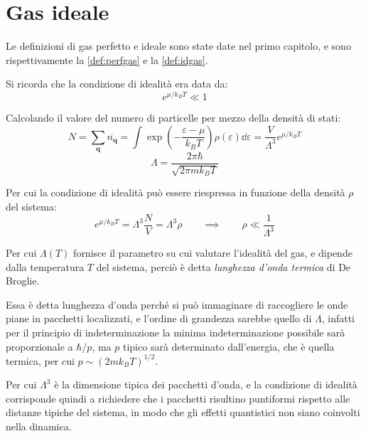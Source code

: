 
\section{Gas ideale}
\label{sec:idgas}

Le definizioni di gas perfetto e ideale sono state date nel primo capitolo, e sono rispettivamente la \cref{def:perfgas} e la \cref{def:idgas}.

Si ricorda che la condizione di idealità era data da:
\begin{equation*}
e^{\mu/k_B T} \ll 1
\end{equation*}

Calcolando il valore del numero di particelle per mezzo della densità di stati:
\begin{equation*}
N = \sum_{\textbf{q}} \overline{n_{\textbf{q}}} = \int \exp \left(- \frac{\varepsilon - \mu}{k_B T}\right) \rho(\varepsilon) \dd \varepsilon = \frac{V}{\Lambda^3} e^{\mu/k_B T}
\end{equation*}
\begin{equation*}
\Lambda = \frac{2\pi \hbar}{\sqrt{2\pi m k_B T}}
\end{equation*}

Per cui la condizione di idealità può essere riespressa in funzione della densità $\rho$ del sistema:
\begin{equation*}
	e^{\mu/k_B T} = \Lambda^3 \frac{N}{V} = \Lambda^3 \rho	\qquad \implies \qquad \rho \ll \frac{1}{\Lambda^3}
\end{equation*}

Per cui $\Lambda(T)$ fornisce il parametro su cui valutare l'idealità del gas, e dipende dalla temperatura $T$ del sistema, perciò è detta \textit{lunghezza d'onda termica} di De Broglie.

Essa è detta lunghezza d'onda perché si può immaginare di raccogliere le onde piane in pacchetti localizzati, e l'ordine di grandezza sarebbe quello di $\Lambda$, infatti per il principio di indeterminazione la minima indeterminazione possibile sarà proporzionale a $\hbar/p$, ma $p$ tipico sarà determinato dall'energia, che è quella termica, per cui $p \sim (2 m k_B T)^{1/2}$.

Per cui $\Lambda^3$ è la dimensione tipica dei pacchetti d'onda, e la condizione di idealità corrisponde quindi a richiedere che i pacchetti risultino puntiformi rispetto alle distanze tipiche del sistema, in modo che gli effetti quantistici non siano coinvolti nella dinamica.

